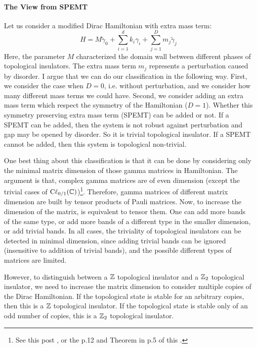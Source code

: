 \documentclass{article}
\begin{document}
\paragraph{The View from SPEMT} Let us consider a modified Dirac Hamiltonian
with extra mass term:
\begin{equation}
    \label{eq:H-spemt}
    H = M\tilde{\gamma}_0 + \sum_{i=1}^{d} k_i \gamma_i 
    + \sum_{j=1}^D m_j\tilde{\gamma}_j
\end{equation}
Here, the parameter $M$ characterized the domain wall between different phases
of topological insulators. The extra mass term $m_j$ represents a perturbation
caused by disorder. I argue that we can do our classification in the following
way. First, we consider the case when $D=0$, i.e. without perturbation, and we
consider how many different mass terms we could have. Second, we consider adding
an extra mass term which respect the symmetry of the Hamiltonian ($D=1$).
Whether this symmetry preserving extra mass term (SPEMT) can be added or not. If
a SPEMT can be added, then the system is not robust against perturbation and gap
may be opened by disorder. So it is trivial topological insulator. If a SPEMT
cannot be added, then this system is topological non-trivial. 

One best thing about this classification is that it can be done by considering
only the minimal matrix dimension of those gamma matrices in Hamiltonian. The
argument is that, complex gamma matrices are of even dimension (except the
trivial cases of $\mathrm{C\ell}_{0/1}(\mathbb{C})$)\footnote{See this post
\cite{PhysicsStackExchange}, or the p.12 and Theorem in p.5 of this
\cite{West1998}.}. Therefore, gamma matrices of different
matrix dimension are built by tensor products of Pauli matrices. Now, to increase the dimension of the matrix, is equivalent to
tensor them. One can add more bands of the same type, or add more bands of a
different type in the smaller dimension, or add trivial bands. In all cases, the
triviality of topological insulators can be detected in minimal dimension, since
adding trivial bands can be ignored (insensitive to addition of trivial bands),
and the possible different types of matrices are limited.

However, to distinguish between a $\mathbb{Z}$ topological insulator and a $\mathbb{Z}_2$
topological insulator, we need to increase the matrix dimension to consider
multiple copies of the Dirac Hamiltonian. If the topological state is stable for
an arbitrary copies, then this is a $\mathbb{Z}$ topological insulator. If the
topological state is stable only of an odd number of copies, this is a $\mathbb{Z}_2$
topological insulator.
\end{document}
